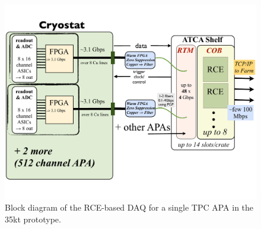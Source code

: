 


\begin{figure}[p]
\includegraphics[scale=0.6,angle=90]{LBNE-DAQ-BlockDiagram-35t.pdf}
\caption{Block diagram of the RCE-based DAQ for a single TPC APA in the 35kt prototype.}
\label{fig:blockDiag}
\end{figure} 

